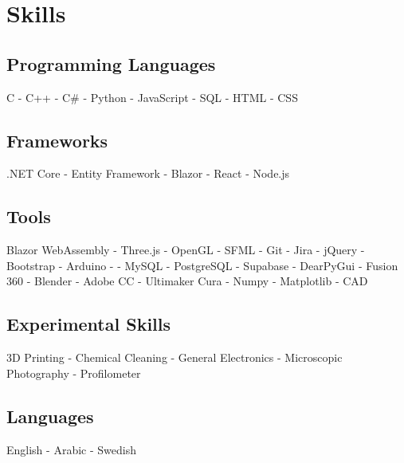 \documentclass{article}
\begin{document}
\newpage 
\begin{minipage}[t]{1\textwidth}
    \section{Skills}
    
    \subsection{Programming Languages}
    \vspace{-0.5em} %
    \normalsize{C - C++ - C\# - Python - JavaScript  - SQL - HTML - CSS}
    \vspace{0.5em} %
    
    \subsection{Frameworks}
   \vspace{-0.5em} %
    \normalsize{.NET Core - Entity Framework - Blazor - React - Node.js}
    \vspace{0.5em} %
    
    \subsection{Tools}
    \vspace{-0.5em} %
    \normalsize{Blazor WebAssembly - Three.js - OpenGL - SFML - Git - Jira - jQuery - Bootstrap - Arduino - - MySQL - PostgreSQL - Supabase - DearPyGui - Fusion 360 - Blender - Adobe CC - Ultimaker Cura - Numpy - Matplotlib - CAD} 
    \vspace{0.5em} %

    \subsection{Experimental Skills}
    \vspace{-0.5em} %
    \normalsize{3D Printing - Chemical Cleaning - General Electronics - Microscopic Photography - Profilometer}
    \vspace{0.5em} %
 
    \subsection{Languages}
    \vspace{-0.5em} %
    \normalsize{English - Arabic - Swedish}
    \vspace{0.5em} %
\end{minipage}
\end{document}
